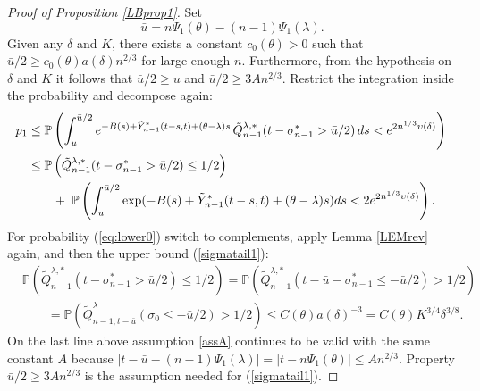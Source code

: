 \documentclass[11pt]{amsart}
\numberwithin{equation}{section}
\theoremstyle{remark}
\providecommand{\abs}[1]{\vert#1\vert}
\begin{document}
\begin{proof}[Proof of Proposition \ref{LBprop1}]
 Set 
\[
\bar u=n{\Psi_1}({\theta})-(n-1){\Psi_1}(\lambda). 
\]
Given any $\delta$ and $K$,  there exists a constant $c_0({\theta})>0$ such that 
   $\bar u/2\ge c_0({\theta})a(\delta)n^{2/3}$  for large enough $n$. 
Furthermore, from the hypothesis on    $\delta$ and $K$ it follows that 
  $\bar u/2\ge u$ and $\bar u/2\ge 3An^{2/3}$. 
Restrict the integration inside the probability and decompose  again:   
\begin{align}
p_1&\le {\mathbb{P}}\left(
\int_u^{\bar u/2}   e^{-B(s)+\tilde Y^*_{n-1}(t-s,t)+({\theta}-\lambda) s}
\,\tilde Q^{\lambda,*}_{n-1}(t-\sigma^*_{n-1}>\bar u/2) \,ds<e^{2 n^{1/3} \upsilon(\delta)}
\right){\nonumber}\\
&\label{eq:lower0}\le {\mathbb{P}}\left(\tilde Q^{\lambda,*}_{n-1}(t-\sigma^*_{n-1}>\bar u/2)\le 1/2\right)\\
&\label{eq:lower1} \qquad +\;
{\mathbb{P}}\left(
\int_u^{\bar u/2} \exp(-B(s)+\tilde Y^*_{n-1}(t-s,t)+({\theta}-\lambda) s) ds<2e^{2 n^{1/3} \upsilon(\delta)}
\right). 
\end{align}
For probability (\ref{eq:lower0}) switch to complements, apply Lemma \ref{LEMrev} again,
and then  the upper bound (\ref{sigmatail1}):
\begin{equation}\begin{aligned}
 &{\mathbb{P}}\left(\tilde Q^{\lambda,*}_{n-1}(t-\sigma^*_{n-1}>\bar u/2)\le  1/2\right)
 = {\mathbb{P}}\left(\tilde Q^{\lambda,*}_{n-1}(t-\bar u-\sigma^*_{n-1}\le -\bar u/2)> 1/2\right)\\
&\qquad   ={\mathbb{P}}\left( \tilde Q^\lambda_{n-1,t-\bar u}(\sigma_0 \le -\bar u/2) >1/2\right)
 \le C({\theta}) a(\delta)^{-3}=C({\theta})K^{3/4}\delta^{3/8}. \end{aligned}\label{eq:lower2}\end{equation}
On the last line above assumption \eqref{assA} continues to be valid with the 
same constant $A$ because 
$
\abs{t-\bar u -(n-1){\Psi_1}(\lambda)}=\abs{t-n{\Psi_1}({\theta})}\le An^{2/3}.  
$
Property $\bar u/2\ge 3An^{2/3}$ is the assumption needed for (\ref{sigmatail1}).  
 


\end{proof}
\end{document}

